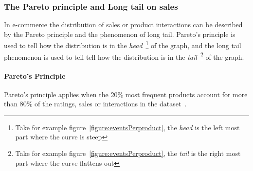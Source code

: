 \subsubsection{The Pareto principle and Long tail on sales}
    In e-commerce the distribution of sales or product interactions can be described by the Pareto principle and the phenomenon of long tail.
    Pareto's principle is used to tell how the distribution is in the \emph{head}~\footnote{Take for example figure~\ref{figure:eventsPerproduct}, the \emph{head} is the left most part where the curve is steep} of the graph, and the long tail phenomenon is used to tell tell how the distribution is in the \emph{tail}~\footnote{Take for example figure~\ref{figure:eventsPerproduct}, the \emph{tail} is the right most part where the curve flattens out} of the graph.


\paragraph{Pareto's Principle}
    Pareto's principle applies when the 20\% most frequent products account for more than 80\% of the ratings, sales or interactions in the dataset~\cite{newman05power}.

